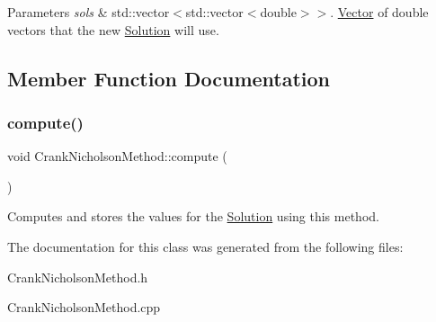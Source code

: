\begin{DoxyParams}{Parameters}
{\em sols} & std\+::vector$<$std\+::vector$<$double$>$$>$. \hyperlink{class_vector}{Vector} of double vectors that the new \hyperlink{class_solution}{Solution} will use. \\
\hline
\end{DoxyParams}


\subsection{Member Function Documentation}
\mbox{\label{class_crank_nicholson_method_a10558e5238673e11a76b4e10e8c588b4}} 
\subsubsection{\texorpdfstring{compute()}{compute()}}
{\footnotesize\ttfamily void Crank\+Nicholson\+Method\+::compute (\begin{DoxyParamCaption}{ }\end{DoxyParamCaption})}

Computes and stores the values for the \hyperlink{class_solution}{Solution} using this method. 

The documentation for this class was generated from the following files\+:\begin{DoxyCompactItemize}
\item 
Crank\+Nicholson\+Method.\+h\item 
Crank\+Nicholson\+Method.\+cpp\end{DoxyCompactItemize}
